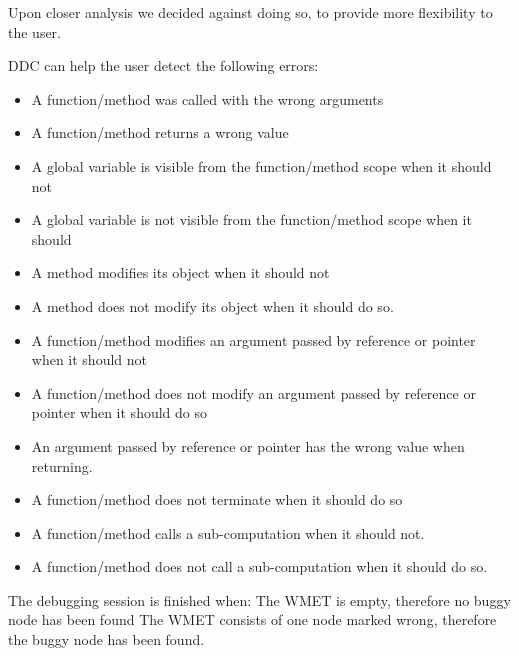 Upon closer analysis we decided against doing so, to provide more flexibility to the user.
\begin{definition}

DDC can help the user detect the following errors:
\begin{itemize}
\item A function/method was called with the wrong arguments
\item A function/method returns a wrong value
\item A global variable is visible from the function/method scope when it should not 
\item A global variable is not visible from the function/method scope when it should 
\item A method modifies its object when it should not 
\item A method does not modify its object when it should do so.
\item A function/method modifies an argument passed by reference or pointer when it should not 
\item A function/method does not modify an argument passed by reference or pointer when it should do so
\item An argument passed by reference or pointer has the wrong value when returning.
\item A function/method does not terminate when it should do so
\item A function/method calls a sub-computation when it should not.
\item A function/method does not call a sub-computation when it should do so.
\end{itemize}
\end{definition}
\begin{definition}
The debugging session is finished when:
The WMET is empty, therefore no buggy node has been found
The WMET consists of one node marked wrong, therefore the buggy node has been found.
\end{definition}
\begin{definition}[Correctness]
\end{definition}
